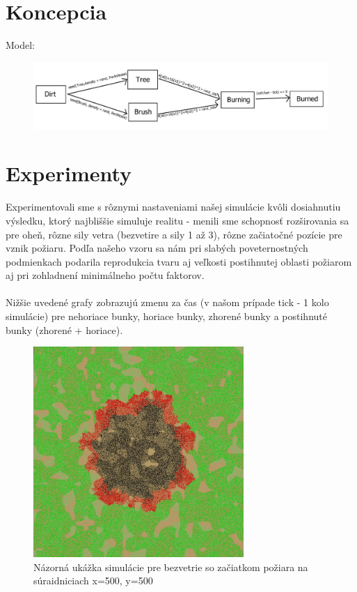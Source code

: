 \documentclass[a4paper,12pt]{article}
\begin{document}
\section{Koncepcia}
Model:\cite{konceptModel}
\begin{figure}[htp]
    \centering
    \includegraphics[width=15cm]{koncept.png}
\end{figure}

\newpage
\section{Experimenty}
Experimentovali sme s rôznymi nastaveniami našej simulácie kvôli dosiahnutiu výsledku, ktorý najbliššie simuluje realitu -
menili sme schopnosť rozširovania sa pre oheň, rôzne sily vetra (bezvetire a sily 1 až 3), rôzne začiatočné pozície pre vznik požiaru.
Podľa našeho vzoru \cite{CAmodel4FF} sa nám pri slabých poveternostných podmienkach podarila reprodukcia tvaru aj veľkosti postihnutej oblasti požiarom
aj pri zohladnení minimálneho počtu faktorov.
\\\\
Nižšie uvedené grafy zobrazujú zmenu za čas (v našom prípade tick - 1 kolo simulácie) pre nehoriace bunky, horiace bunky, zhorené bunky
a postihnuté bunky (zhorené + horiace).

\begin{figure}[htp]
    \centering 
    \includegraphics[width=8cm]{none.png}
    \caption{Názorná ukážka simulácie pre bezvetrie so začiatkom požiara na súraidniciach x=500, y=500}
\end{figure}
\end{document}
